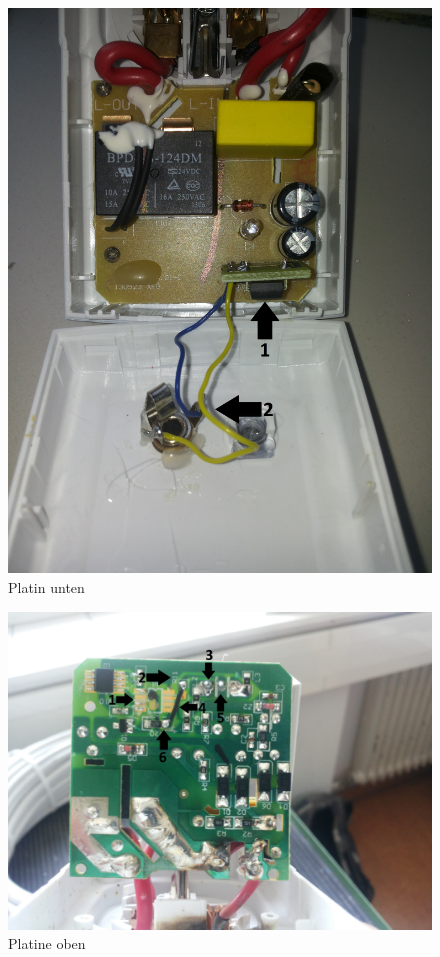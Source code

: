 \begin{figure}[H]
\centering
\includegraphics[keepaspectratio=true, width=13cm]{images/rpi/rpi_platine_top.jpg}
\caption{Platin unten}
\label{fig:report_hardware_plTo}
\end{figure}
\begin{figure}[H]
\centering
\includegraphics[keepaspectratio=true, width=17cm]{images/rpi/rpi_platine_bottom.jpg}
\caption{Platine oben}
\label{fig:report_hardware_plBo}
\end{figure}